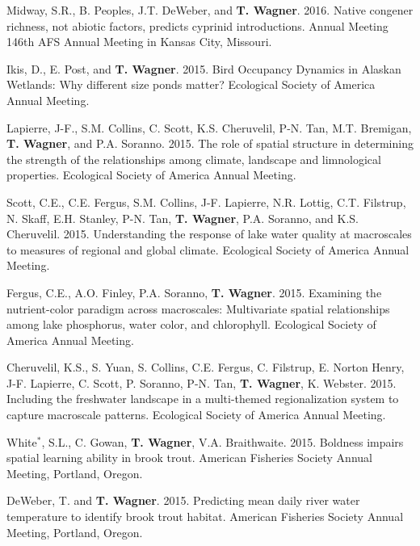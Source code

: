 \documentclass[10pt]{article}
\begin{document}
\begin{flushleft}
\begin{etaremune}
\item Midway, S.R., B. Peoples, J.T. DeWeber, and {\bf T. Wagner}. 2016. Native congener richness, not abiotic factors, predicts cyprinid introductions. Annual Meeting 146th AFS Annual Meeting in Kansas City, Missouri. 


\item Ikis, D., E. Post, and {\bf T. Wagner}. 2015. Bird Occupancy Dynamics in Alaskan Wetlands: Why different size ponds matter?  Ecological Society of America Annual Meeting. 

\item Lapierre, J-F., S.M. Collins, C. Scott, K.S. Cheruvelil, P-N. Tan, M.T. Bremigan, {\bf T. Wagner}, and P.A. Soranno. 2015. The role of spatial structure in determining the strength of the relationships among climate, landscape and limnological properties. Ecological Society of America Annual Meeting.\\

\item Scott, C.E., C.E. Fergus, S.M. Collins, J-F. Lapierre, N.R. Lottig, C.T. Filstrup, N. Skaff, E.H. Stanley, P-N. Tan, {\bf T. Wagner}, P.A. Soranno, and K.S. Cheruvelil. 2015. Understanding the response of lake water quality at macroscales to measures of regional and global climate. Ecological Society of America Annual Meeting.

\item Fergus, C.E., A.O. Finley, P.A. Soranno, {\bf T. Wagner}. 2015. Examining the nutrient-color paradigm across macroscales: Multivariate spatial relationships among lake phosphorus, water color, and chlorophyll.  Ecological Society of America Annual Meeting.

\item Cheruvelil, K.S., S. Yuan, S. Collins, C.E. Fergus, C. Filstrup, E. Norton Henry, J-F. Lapierre, C. Scott, P. Soranno, P-N. Tan, {\bf T. Wagner}, K. Webster. 2015. Including the freshwater landscape in a multi-themed regionalization system to capture macroscale patterns. Ecological Society of America Annual Meeting.

\item White$^*$, S.L., C. Gowan, {\bf T. Wagner}, V.A. Braithwaite. 2015. Boldness impairs spatial learning ability in brook trout. American Fisheries Society Annual Meeting, Portland, Oregon.

\item DeWeber, T. and {\bf T. Wagner}. 2015. Predicting mean daily river water temperature to identify brook trout habitat. American Fisheries Society Annual Meeting, Portland, Oregon.


\end{etaremune}
\end{flushleft}
\end{document}

